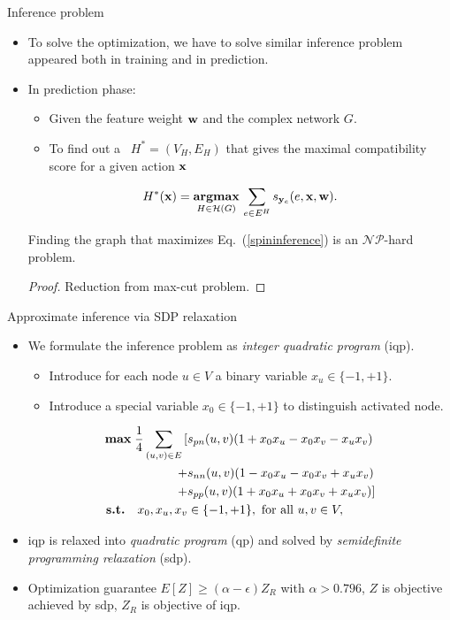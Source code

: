 \documentclass[first=dgreen,second=purple,logo=red]{aaltoslides}
\begin{document}
\begin{frame}{Inference problem}
	\begin{itemize}
		\item To solve the optimization, we have to solve similar inference problem appeared both in training and in prediction.
		\item In prediction phase:
		\begin{itemize}\footnotesize
			\item Given the feature weight $\mathbf {w}$ and the complex network $G$.
			\item To find out a \daggraph\ $H^*=(V_H,E_H)$ that gives the maximal compatibility score for a given action $\mathbf {x}$
		\end{itemize}
	\begin{align}
		H^*(\mathbf {x}) = \underset{H\in \mathcal{H}(G)}{\textbf{argmax}}\, \sum_{e\in E^H}s_{\mathbf {y}_e}(e,\mathbf {x},\mathbf {w}).\label{spininference}
	\end{align}
	\begin{lemma}\footnotesize
		Finding the graph that maximizes Eq.~(\ref{spininference}) is an $\mathcal{NP}$-hard problem.
	\end{lemma}
	\begin{proof}\footnotesize
		Reduction from {\sc max-cut} problem.
	\end{proof}
	\end{itemize}
\end{frame}

\begin{frame}[allowframebreaks]{Approximate inference via {\sc SDP} relaxation}
	\begin{itemize}\footnotesize
		\item We formulate the inference problem as {\it integer quadratic program} ({\sc iqp}).
		\begin{itemize}\footnotesize
			\item Introduce for each node $u\in V$ a binary variable $x_u\in\{-1,+1\}$.
			\item Introduce a special variable $x_0\in\{-1,+1\}$ to distinguish activated node.
		\end{itemize}
		{\scriptsize
		\begin{align*}
		\textbf{max} \; \frac{1}{4} \sum_{(u, v)\in E}\, [ & s_{\sc pn}(u,v) (1 + x_0 x_u - x_0 x_v - x_u x_v)  \\ 
			+ & s_{\sc nn}(u,v) (1 - x_0 x_u - x_0 x_v + x_u x_v)  \\ 
			+ & s_{\sc pp}(u,v) (1 + x_0 x_u + x_0 x_v + x_u x_v) ] \\
		\textbf{s.t.} \quad  x_0, x_u, x_v &\in \{-1,+1\}, \text{ for all } u,v\in V,
		\end{align*}}
		\item {\sc iqp} is relaxed into {\em quadratic program} ({\sc qp}) and solved by {\it semidefinite programming relaxation} ({\sc sdp}).
		\item Optimization guarantee $E[Z] \ge (\alpha-\epsilon) Z_{R} $ with $\alpha>0.796$, $Z$ is objective achieved by {\sc sdp}, $Z_R$ is objective of {\sc iqp}.
	\end{itemize}
\end{frame}
\end{document}
